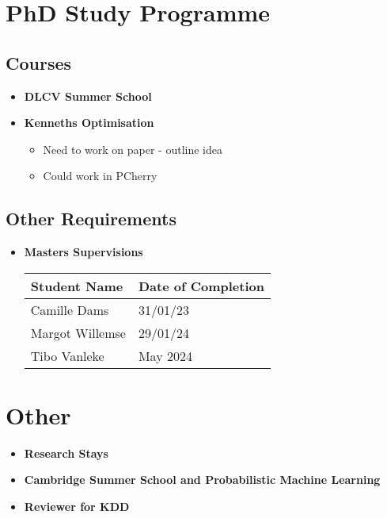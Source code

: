 \section{PhD Study Programme}

\subsection{Courses}

\begin{itemize}
    \item \textbf{DLCV Summer School}
    \item \textbf{Kenneths Optimisation}
    \begin{itemize}
        \item Need to work on paper - outline idea
        \item Could work in PCherry
    \end{itemize}
\end{itemize}

\subsection{Other Requirements}

\begin{itemize}
    \item \textbf{Masters Supervisions}
    \begin{table}[h]
    \centering
    \begin{tabular}{|l|l|}
        \hline
        \textbf{Student Name} & \textbf{Date of Completion} \\ \hline
        Camille Dams & 31/01/23 \\ \hline
        Margot Willemse & 29/01/24 \\ \hline
        Tibo Vanleke & May 2024 \\ \hline
    \end{tabular}
\end{table}
\end{itemize}

\section{Other}

\begin{itemize}
    \item \textbf{Research Stays}
    \item \textbf{Cambridge Summer School and Probabilistic Machine Learning}
    \item \textbf{Reviewer for KDD}
\end{itemize}

% 
